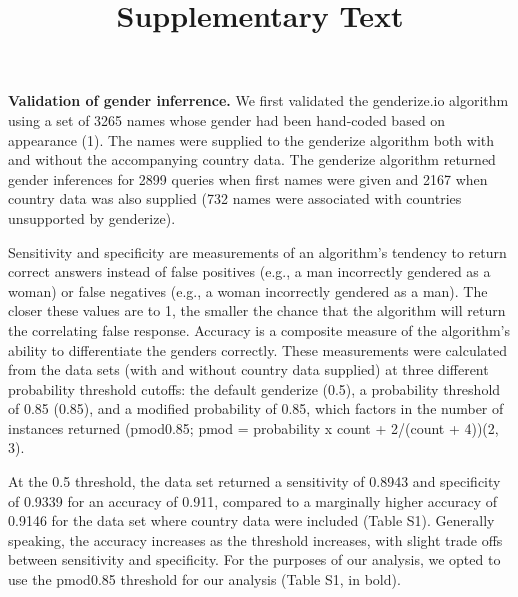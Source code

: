 \documentclass[11pt,]{article}
\title{Supplementary Text}
\author{}
\date{}
\begin{document}
\maketitle

\textbf{Validation of gender inferrence.} We first validated the
genderize.io algorithm using a set of 3265 names whose gender had been
hand-coded based on appearance (1). The names were supplied to the
genderize algorithm both with and without the accompanying country data.
The genderize algorithm returned gender inferences for 2899 queries when
first names were given and 2167 when country data was also supplied (732
names were associated with countries unsupported by genderize).

Sensitivity and specificity are measurements of an algorithm's tendency
to return correct answers instead of false positives (e.g., a man
incorrectly gendered as a woman) or false negatives (e.g., a woman
incorrectly gendered as a man). The closer these values are to 1, the
smaller the chance that the algorithm will return the correlating false
response. Accuracy is a composite measure of the algorithm's ability to
differentiate the genders correctly. These measurements were calculated
from the data sets (with and without country data supplied) at three
different probability threshold cutoffs: the default genderize (0.5), a
probability threshold of 0.85 (0.85), and a modified probability of
0.85, which factors in the number of instances returned (pmod0.85; pmod
= probability x count + 2/(count + 4))(2, 3).

At the 0.5 threshold, the data set returned a sensitivity of 0.8943 and
specificity of 0.9339 for an accuracy of 0.911, compared to a marginally
higher accuracy of 0.9146 for the data set where country data were
included (Table S1). Generally speaking, the accuracy increases as the
threshold increases, with slight trade offs between sensitivity and
specificity. For the purposes of our analysis, we opted to use the
pmod0.85 threshold for our analysis (Table S1, in bold).
\end{document}
